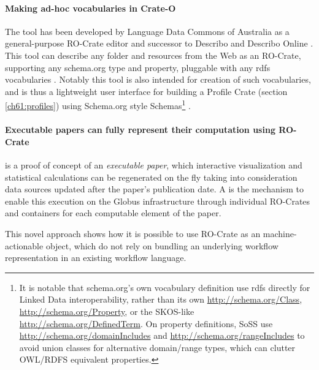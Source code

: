 \paragraph{Making ad-hoc vocabularies in Crate-O}\label{ch61:crate-o}
The  tool has been developed by Language Data Commons of Australia  as a general-purpose RO-Crate editor and successor to Describo \cite{ch5-78} and Describo Online \cite{ch5-77}. 
This tool can describe any folder and resources from the Web as an RO-Crate, supporting any schema.org type and property, pluggable with any rdfs vocabularies \cite{w3-rdf-schema}. 
Notably this tool is also intended for creation of such vocabularies, and is thus a lightweight user interface for building a Profile Crate (section \vref{ch61:profiles}) using Schema.org style Schemas\footnote{
  It is notable that schema.org's own vocabulary definition use rdfs directly for Linked Data interoperability, 
  rather than its own \url{http://schema.org/Class}, \url{http://schema.org/Property}, or the SKOS-like \url{http://schema.org/DefinedTerm}. 
  On property definitions, SoSS use \url{http://schema.org/domainIncludes} and \url{http://schema.org/rangeIncludes} to avoid union classes for alternative domain/range types, which can clutter OWL/RDFS equivalent properties.} 
.

\paragraph{Executable papers can fully represent their computation using RO-Crate}
\label{ch61:livepublication}

 \cite{Ellerm 2023} is a proof of concept of an \emph{executable paper}, which interactive visualization and statistical calculations can be regenerated on the fly taking into consideration data sources updated after the paper's publication date. A  is the mechanism to enable this execution on the Globus infrastructure through individual RO-Crates and containers for each computable element of the paper.

This novel approach shows how it is possible to use RO-Crate as an machine-actionable object, which do not rely on bundling an underlying workflow representation in an existing workflow language.  

